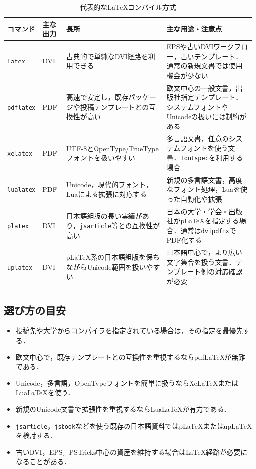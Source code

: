 \documentclass[a4paper,11pt]{jsarticle}
\newcommand{\code}[1]{\texttt{#1}}
\begin{document}
\begin{table}[H]
  \centering
  \small
  \caption{代表的なLaTeXコンパイル方式}
  \label{tab:compiler-comparison}
  \begin{tabular}{|>{\raggedright\arraybackslash}p{20mm}
                  |>{\raggedright\arraybackslash}p{24mm}
                  |>{\raggedright\arraybackslash}p{47mm}
                  |>{\raggedright\arraybackslash}p{47mm}|}
    \hline
    コマンド & 主な出力 & 長所 & 主な用途・注意点 \\
    \hline
    \code{latex} & DVI & 古典的で単純なDVI経路を利用できる & EPSや古いDVIワークフロー，古いテンプレート．通常の新規文書では使用機会が少ない \\
    \hline
    \code{pdflatex} & PDF & 高速で安定し，既存パッケージや投稿テンプレートとの互換性が高い & 欧文中心の一般文書，出版社指定テンプレート．システムフォントやUnicodeの扱いには制約がある \\
    \hline
    \code{xelatex} & PDF & UTF-8とOpenType/TrueTypeフォントを扱いやすい & 多言語文書，任意のシステムフォントを使う文書．\code{fontspec}を利用する場合 \\
    \hline
    \code{lualatex} & PDF & Unicode，現代的フォント，Luaによる拡張に対応する & 新規の多言語文書，高度なフォント処理，Luaを使った自動化や拡張 \\
    \hline
    \code{platex} & DVI & 日本語組版の長い実績があり，\code{jsarticle}等との互換性が高い & 日本の大学・学会・出版社がpLaTeXを指定する場合．通常は\code{dvipdfmx}でPDF化する \\
    \hline
    \code{uplatex} & DVI & pLaTeX系の日本語組版を保ちながらUnicode範囲を扱いやすい & 日本語中心で，より広い文字集合を扱う文書．テンプレート側の対応確認が必要 \\
    \hline
  \end{tabular}
\end{table}

\subsection{選び方の目安}

\begin{itemize}
  \item 投稿先や大学からコンパイラを指定されている場合は，その指定を最優先する．
  \item 欧文中心で，既存テンプレートとの互換性を重視するならpdfLaTeXが無難である．
  \item Unicode，多言語，OpenTypeフォントを簡単に扱うならXeLaTeXまたはLuaLaTeXを使う．
  \item 新規のUnicode文書で拡張性を重視するならLuaLaTeXが有力である．
  \item \code{jsarticle}，\code{jsbook}などを使う既存の日本語資料ではpLaTeXまたはupLaTeXを検討する．
  \item 古いDVI，EPS，PSTricks中心の資産を維持する場合はLaTeX経路が必要になることがある．
\end{itemize}
\end{document}

